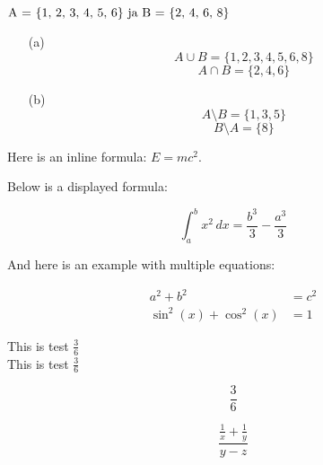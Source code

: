 \documentclass{article}
\begin{document}
	\( $A = \{1, 2, 3, 4, 5, 6\}$ \ \text{ja} \ $B = \{2, 4, 6, 8\}$\)

\begin{enumerate}

	\item[(a)]
	\[
	A \cup B = \{1, 2, 3, 4, 5, 6, 8\}
	\]
	\[
	A \cap B = \{2, 4, 6\}
	\]

	\item[(b)]
	\[
	A \setminus B = \{ 1, 3, 5\}
	\]
	\[
	B \setminus A = \{ 8\}
	\]

\end{enumerate}





	
	Here is an inline formula: \(E = mc^2\).
	
	Below is a displayed formula:
	
	\[
	\int_{a}^{b} x^2 \, dx = \frac{b^3}{3} - \frac{a^3}{3}
	\]
	
	And here is an example with multiple equations:
	
	\begin{align}
		a^2 + b^2 &= c^2 \\
		\sin^2(x) + \cos^2(x) &= 1
	\end{align}


	This is test \(\frac{3}{6}\) \\
	This is test \(\frac{3}{6}\)
	
	\[
	\frac{3}{6} 
	\]
	
	
	
	\[
	\frac{\frac{1}{x}+\frac{1}{y}}{y-z}
	\]
	
\end{document}
